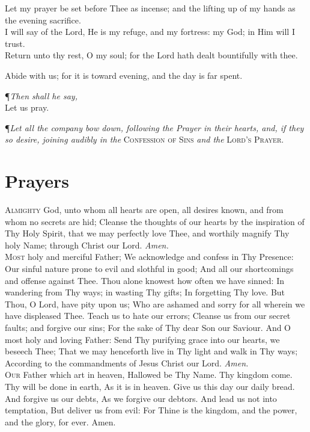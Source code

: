 Let my prayer be set before Thee as incense; and the lifting up of my hands as the evening sacrifice. \\

I will say of the Lord, He is my refuge, and my fortress: my God; in Him will I trust. \\

Return unto thy rest, O my soul; for the Lord hath dealt bountifully with thee.

Abide with us; for it is toward evening, and the day is far spent.

{\centering \P\textit{Then shall he say,} \\ Let us pray. \par} 
\vspace{2ex}
\noindent\P\textit{Let all the company bow down, following the Prayer in their hearts, and, if they so desire, joining audibly in the} \textsc{Confession of Sins} \textit{and the} \textsc{Lord's Prayer.}    

\section*{Prayers}

\lettrine{A}{lmighty} God, unto whom all hearts are open, all desires known, and from whom no secrets are hid; Cleanse the thoughts of our hearts by the inspiration of Thy Holy Spirit, that we may perfectly love Thee, and worthily magnify Thy holy Name; through Christ our Lord.
\textit{Amen.} \\

\noindent\lettrine{M}{ost} holy and merciful Father; We acknowledge and confess in Thy Presence: Our sinful nature prone to evil and slothful in good; And all our shortcomings and offense against Thee.
Thou alone knowest how often we have sinned: In wandering from Thy ways; in wasting Thy gifts; In forgetting Thy love.
But Thou, O Lord, have pity upon us; Who are ashamed and sorry for all wherein we have displeased Thee.
Teach us to hate our errors; Cleanse us from our secret faults; and forgive our sins; For the sake of Thy dear Son our Saviour.
And O most holy and loving Father: Send Thy purifying grace into our hearts, we beseech Thee; That we may henceforth live in Thy light and walk in Thy ways; According to the commandments of Jesus Christ our Lord.
\textit{Amen.} \\

\lettrine{O}{ur} Father which art in heaven, Hallowed be Thy Name.
Thy kingdom come.
Thy will be done in earth, As it is in heaven.
Give us this day our daily bread.
And forgive us our debts, As we forgive our debtors.
And lead us not into temptation, But deliver us from evil:
For Thine is the kingdom, and the power, and the glory, for ever.
Amen.

